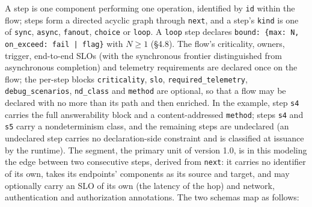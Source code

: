 \documentclass[11pt]{article}
\newcommand{\code}[1]{\texttt{#1}}
\begin{document}
A step is one component performing one operation, identified by \code{id} within the flow; steps form a directed acyclic graph through \code{next}, and a step's \code{kind} is one of \code{sync}, \code{async}, \code{fanout}, \code{choice} or \code{loop}. A \code{loop} step declares \code{bound: \{max: N, on\_exceed: fail | flag\}} with \(N \geq 1\) (\S4.8). The flow's criticality, owners, trigger, end-to-end SLOs (with the synchronous frontier distinguished from asynchronous completion) and telemetry requirements are declared once on the flow; the per-step blocks \code{criticality}, \code{slo}, \code{required\_telemetry}, \code{debug\_scenarios}, \code{nd\_class} and \code{method} are optional, so that a flow may be declared with no more than its path and then enriched. In the example, step \code{s4} carries the full answerability block and a content-addressed \code{method}; steps \code{s4} and \code{s5} carry a nondeterminism class, and the remaining steps are undeclared (an undeclared step carries no declaration-side constraint and is classified at issuance by the runtime). The segment, the primary unit of version 1.0, is in this modeling the edge between two consecutive steps, derived from \code{next}: it carries no identifier of its own, takes its endpoints' components as its source and target, and may optionally carry an SLO of its own (the latency of the hop) and network, authentication and authorization annotations. The two schemas map as follows:
\end{document}
